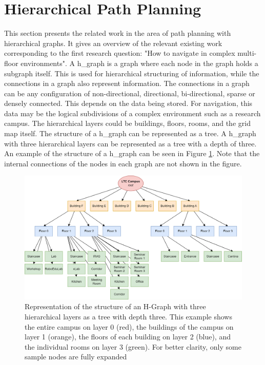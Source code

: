 \section{Hierarchical Path Planning}
\label{sec:hierarchical_planning}
This section presents the related work in the area of path planning with hierarchical graphs. It gives an overview of the relevant existing work corresponding to the first research question: "How to navigate in complex multi-floor environments". 
A \Gls{h_graph} is a graph where each node in the graph holds a subgraph itself. This is used for hierarchical structuring of information, while the connections in a graph also represent information. The connections in a graph can be any configuration of non-directional, directional, bi-directional, sparse or densely connected. This depends on the data being stored. For navigation, this data may be the logical subdivisions of a complex environment such as a research campus. The hierarchical layers could be buildings, floors, rooms, and the grid map itself. The structure of a \gls{h_graph} can be represented as a tree. A \gls{h_graph} with three hierarchical layers can be represented as a tree with a depth of three. An example of the structure of a \gls{h_graph} can be seen in Figure \ref{fig:h_graph}. Note that the internal connections of the nodes in each graph are not shown in the figure. 

\begin{figure}[h]
    \centering
    \includegraphics[width=\textwidth]{figures/20_state_of_the_art/hierarchical_graph.png}
    \caption[Representation of the structure of an H-Graph as tree]{Representation of the structure of an H-Graph with three hierarchical layers as a tree with depth three. This example shows the entire campus on layer 0 (red), the buildings of the campus on layer 1 (orange), the floors of each building on layer 2 (blue), and the individual rooms on layer 3 (green). For better clarity, only some sample nodes are fully expanded}
    \label{fig:h_graph}
\end{figure}

